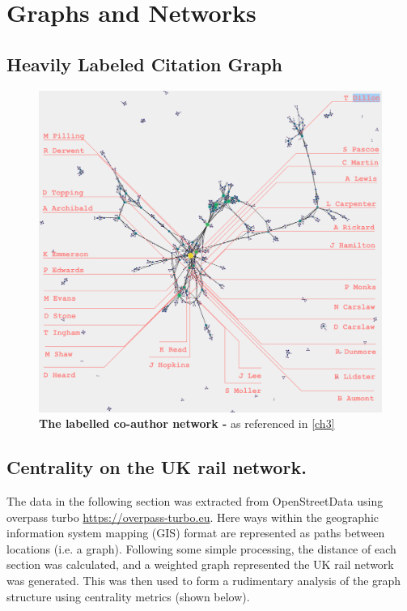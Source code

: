 \chapter{Graphs and Networks}


\section{Heavily Labeled Citation Graph}\label{appendix:fullauthor}

\begin{figure}[H]
     \centering
         \includegraphics[width=\textwidth]{WACLauthor.png}
        \caption{ \textbf{The labelled co-author network -} as  referenced in \autoref{ch3} }

\end{figure}
\newpage


\section{Centrality on the UK rail network.}\label{appendix:rail}

The data in the following section was extracted from OpenStreetData using overpass turbo \url{https://overpass-turbo.eu}. Here ways within the geographic information system mapping (GIS) format are represented as paths between locations (i.e. a graph). Following some simple processing, the distance of each section was calculated, and a weighted graph represented the UK rail network was generated. This was then used to form a rudimentary analysis of the graph structure using centrality metrics (shown below).

